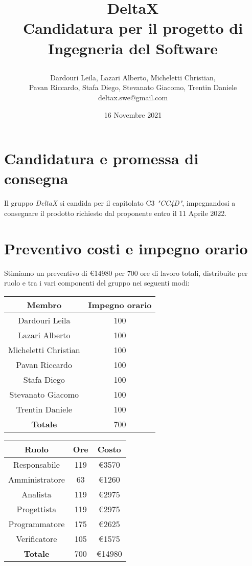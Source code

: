 \documentclass[12pt]{article}
\title{
\vspace{-3cm}
\begin{figure}[h]
  \centering
  
\end{figure}
\vspace{-0.5cm}
DeltaX \\
\vspace{0.3cm}
Candidatura per il progetto di Ingegneria del Software
}
\author{
Dardouri Leila, Lazari Alberto, Micheletti Christian, \\
Pavan Riccardo, Stafa Diego, Stevanato Giacomo, Trentin Daniele \vspace{0.4cm}\\
deltax.swe@gmail.com
}
\date{16 Novembre 2021}
\begin{document}
\maketitle

\section*{Candidatura e promessa di consegna}

Il gruppo \textit{DeltaX} si candida per il capitolato C3 \textit{"CC4D"}, impegnandosi a consegnare il prodotto richiesto dal proponente entro il 11 Aprile 2022. 

\section*{Preventivo costi e impegno orario}

Stimiamo un preventivo di \euro 14980 per 700 ore di lavoro totali, distribuite per ruolo e tra i vari componenti del gruppo nei seguenti modi:

\begin{table}[h]
    \centering
    \begin{tabular}{|c|c|}
        \hline
        \textbf{Membro} & \textbf{Impegno orario} \\
        \hline
        Dardouri Leila       & 100 \\
        Lazari Alberto       & 100 \\
        Micheletti Christian & 100 \\
        Pavan Riccardo       & 100 \\
        Stafa Diego          & 100 \\
        Stevanato Giacomo    & 100 \\
        Trentin Daniele      & 100 \\
        \hline
        \textbf{Totale} & 700 \\
        \hline
    \end{tabular}
    \quad\quad\quad\quad\quad
    \begin{tabular}{|c|c|c|}
        \hline
        \textbf{Ruolo} & \textbf{Ore} & \textbf{Costo} \\
        \hline
        Responsabile    & 119 & \euro 3570 \\
        Amministratore  &  63 & \euro 1260 \\
        Analista        & 119 & \euro 2975 \\
        Progettista     & 119 & \euro 2975 \\
        Programmatore   & 175 & \euro 2625 \\
        Verificatore    & 105 & \euro 1575 \\
        \hline
        \textbf{Totale} & 700 & \euro 14980 \\
        \hline
    \end{tabular}
\end{table}
\end{document}
